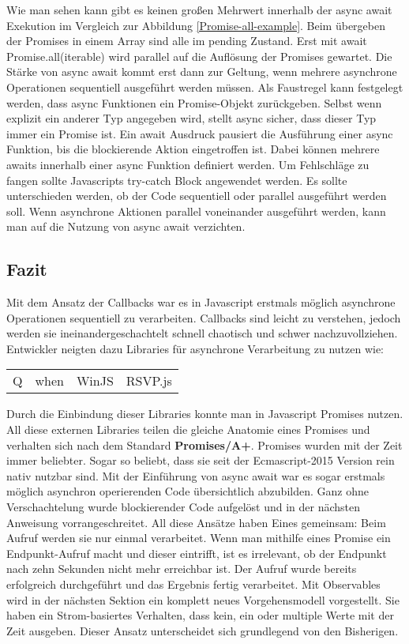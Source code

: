 \noindent
Wie man sehen kann gibt es keinen großen Mehrwert innerhalb der async await Exekution im Vergleich zur Abbildung \ref{Promise-all-example}. Beim übergeben der Promises in einem Array sind alle im pending Zustand. Erst mit await Promise.all(iterable) wird parallel auf die Auflösung der Promises gewartet. Die Stärke von async await kommt erst dann zur Geltung, wenn mehrere asynchrone Operationen sequentiell ausgeführt werden müssen. Als Faustregel kann festgelegt werden, dass async Funktionen ein Promise-Objekt zurückgeben. Selbst wenn explizit ein anderer Typ angegeben wird, stellt async sicher, dass dieser Typ immer ein Promise ist. Ein await Ausdruck pausiert die Ausführung einer async Funktion, bis die blockierende Aktion eingetroffen ist. Dabei können mehrere awaits innerhalb einer async Funktion definiert werden. Um Fehlschläge zu fangen sollte Javascripts try-catch Block angewendet werden. Es sollte unterschieden werden, ob der Code sequentiell oder parallel ausgeführt werden soll. Wenn asynchrone Aktionen parallel voneinander ausgeführt werden, kann man auf die Nutzung von async await verzichten.

\subsection{Fazit}

Mit dem Ansatz der Callbacks war es in Javascript erstmals möglich asynchrone Operationen sequentiell zu verarbeiten. Callbacks sind leicht zu verstehen, jedoch werden sie ineinandergeschachtelt schnell chaotisch und schwer nachzuvollziehen. Entwickler neigten dazu Libraries für asynchrone Verarbeitung zu nutzen wie:

\begin{center}
\begin{tabular}{ l c c r }
  Q & when & WinJS & RSVP.js\\
\end{tabular}
\end{center}

\noindent
Durch die Einbindung dieser Libraries konnte man in Javascript Promises nutzen. All diese externen Libraries teilen die gleiche Anatomie eines Promises und verhalten sich nach dem Standard \textbf{Promises/A+}\cite{promises-a+}. Promises wurden mit der Zeit immer beliebter. Sogar so beliebt, dass sie seit der Ecmascript-2015 Version rein nativ nutzbar sind. Mit der Einführung von async await war es sogar erstmals möglich asynchron operierenden Code übersichtlich abzubilden. Ganz ohne Verschachtelung wurde blockierender Code aufgelöst und in der nächsten Anweisung vorrangeschreitet. All diese Ansätze haben Eines gemeinsam: Beim Aufruf werden sie nur einmal verarbeitet. Wenn man mithilfe eines Promise ein Endpunkt-Aufruf macht und dieser eintrifft, ist es irrelevant, ob der Endpunkt nach zehn Sekunden nicht mehr erreichbar ist. Der Aufruf wurde bereits erfolgreich durchgeführt und das Ergebnis fertig verarbeitet. Mit Observables wird in der nächsten Sektion ein komplett neues Vorgehensmodell vorgestellt. Sie haben ein Strom-basiertes Verhalten, dass kein, ein oder multiple Werte mit der Zeit ausgeben. Dieser Ansatz unterscheidet sich grundlegend von den Bisherigen.
